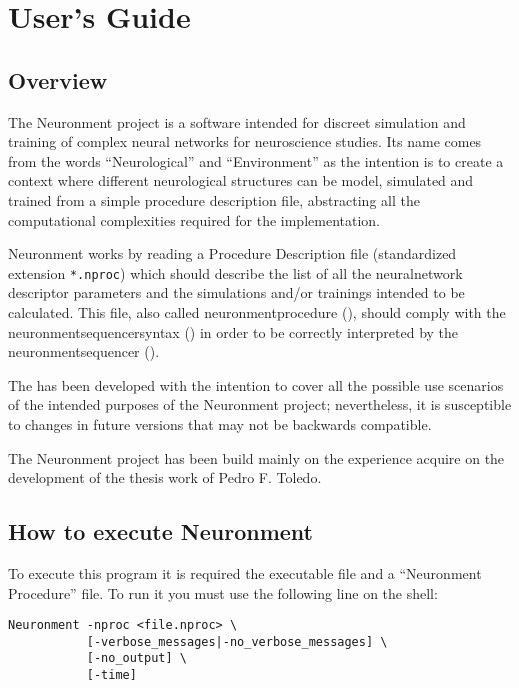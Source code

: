 \chapter{User's Guide}
\label{ch:usersguide}

\section{Overview}

The Neuronment project is a software intended for discreet simulation and training of complex neural networks for neuroscience studies. Its name comes from the words ``Neurological'' and ``Environment'' as the intention is to create a context where different neurological structures can be model, simulated and trained from a simple procedure description file, abstracting all the computational complexities required for the implementation.

Neuronment works by reading a Procedure Description file (standardized extension \texttt{*.nproc}) which should describe the list of all the \gls{neuralnetwork} descriptor parameters and the simulations and/or trainings intended to be calculated. This file, also called  \gls{neuronmentprocedure} (), should comply with the \gls{neuronmentsequencersyntax} () in order to be correctly interpreted by the \gls{neuronmentsequencer} ().

The  has been developed with the intention to cover all the possible use scenarios of the intended purposes of the Neuronment project; nevertheless, it is susceptible to changes in future versions that may not be backwards compatible.

The Neuronment project has been build mainly on the experience acquire on the development of the thesis work of Pedro F. Toledo\cite{thesispedro}.

\section{How to execute Neuronment}

To execute this program it is required the executable file and a ``Neuronment Procedure'' file. To run it you must use the following line on the shell:

\begin{verbatim}
Neuronment -nproc <file.nproc> \
           [-verbose_messages|-no_verbose_messages] \
           [-no_output] \
           [-time]
\end{verbatim}

